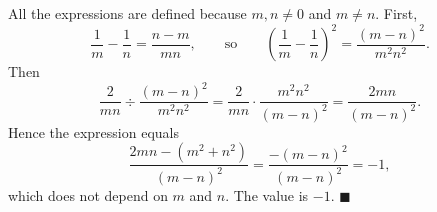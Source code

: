 All the expressions are defined because $m,n\ne0$ and $m\ne n$. First,
\[
\dfrac{1}{m}-\dfrac{1}{n}=\dfrac{n-m}{mn},\qquad\text{so}\qquad\left(\dfrac{1}{m}-\dfrac{1}{n}\right)^2=\dfrac{(m-n)^2}{m^2n^2}.
\]
Then
\[
\dfrac{2}{mn}\div\dfrac{(m-n)^2}{m^2n^2}=\dfrac{2}{mn}\cdot\dfrac{m^2n^2}{(m-n)^2}=\dfrac{2mn}{(m-n)^2}.
\]
Hence the expression equals
\[
\dfrac{2mn-\left(m^2+n^2\right)}{(m-n)^2}=\dfrac{-(m-n)^2}{(m-n)^2}=-1,
\]
which does not depend on $m$ and $n$. The value is $\boxed{-1}$. $\blacksquare$
